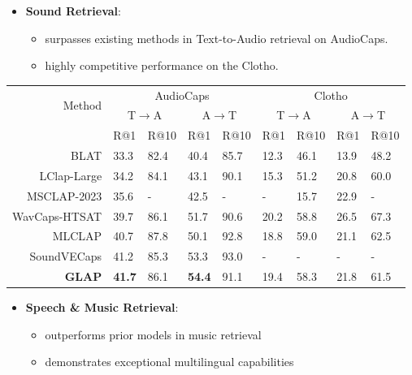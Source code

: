 \begin{itemize}
    \item \textbf{Sound Retrieval}:
    \begin{itemize}
        \item surpasses existing methods in Text-to-Audio retrieval on AudioCaps.
        \item highly competitive performance on the Clotho.
    \end{itemize}
\end{itemize}

\vspace{0.5cm}
\begin{center}
\fontsize{26pt}{30pt}\selectfont
\setlength{\tabcolsep}{16pt}
\begin{tabular}{r|llll|llll}
\toprule
\multirow{2}{*}{Method} & \multicolumn{4}{c|}{AudioCaps} & \multicolumn{4}{c}{Clotho} \\
& \multicolumn{2}{c}{T$\rightarrow$A} & \multicolumn{2}{c|}{A$\rightarrow$T} & \multicolumn{2}{c}{T$\rightarrow$A} & \multicolumn{2}{c}{A$\rightarrow$T}\\
& R@1 & R@10 & R@1 & R@10 & R@1 & R@10 & R@1 & R@10 \\
\midrule
BLAT & 33.3 & 82.4 & 40.4 & 85.7 & 12.3 & 46.1 & 13.9 & 48.2 \\
LClap-Large & 34.2 & 84.1 & 43.1 & 90.1 & 15.3 & 51.2 & 20.8 & 60.0 \\
MSCLAP-2023 & 35.6 & - & 42.5 & - & - & 15.7 & 22.9 & - \\
WavCaps-HTSAT & 39.7 & 86.1 & 51.7 & 90.6 & 20.2 & 58.8 & 26.5 & 67.3 \\
MLCLAP & 40.7 & {\color{xiaomi_gray}87.8} & 50.1 & 92.8 & 18.8 & 59.0 & 21.1 & 62.5 \\
SoundVECaps & 41.2 & 85.3 & 53.3 & 93.0 & - & - & - & - \\
\hline
\textbf{GLAP} & \textbf{41.7} & 86.1 & \textbf{54.4} & 91.1 & 19.4 & 58.3 & 21.8 & 61.5 \\
\bottomrule
\end{tabular}
\end{center}

\vspace{0.5cm}
\begin{itemize}
    \item \textbf{Speech \& Music Retrieval}:
    \begin{itemize}
        \item outperforms prior models in music retrieval
        \item demonstrates exceptional multilingual capabilities
    \end{itemize}
\end{itemize}


